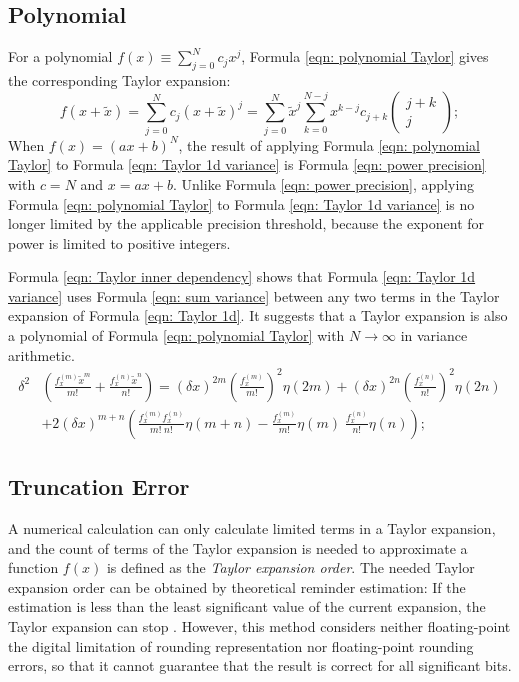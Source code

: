 \documentclass[twoside]{article}
\numberwithin{equation}{section}
\begin{document}
\fi

\subsection{Polynomial}

For a polynomial $f(x) \equiv \sum_{j=0}^{N} c_j x^j$, Formula \eqref{eqn: polynomial Taylor} gives the corresponding Taylor expansion:
\begin{equation}
\label{eqn: polynomial Taylor}
f(x + \tilde{x}) = \sum_{j=0}^{N} c_j (x + \tilde{x})^j = \sum_{j=0}^{N} \tilde{x}^{j} \sum_{k=0}^{N-j} x^{k - j} c_{j + k} \begin{pmatrix} j + k \\ j \end{pmatrix};
\end{equation}
When $f(x) = (ax + b)^N$, the result of applying Formula \eqref{eqn: polynomial Taylor} to Formula \eqref{eqn: Taylor 1d variance} is Formula \eqref{eqn: power precision} with $c=N$ and $x = ax + b$. 
Unlike Formula \eqref{eqn: power precision}, applying Formula \eqref{eqn: polynomial Taylor} to Formula \eqref{eqn: Taylor 1d variance} is no longer limited by the applicable precision threshold, because the exponent for power is limited to positive integers.

Formula \eqref{eqn: Taylor inner dependency} shows that Formula \eqref{eqn: Taylor 1d variance} uses Formula \eqref{eqn: sum variance} between any two terms in the Taylor expansion of Formula \eqref{eqn: Taylor 1d}.
It suggests that a Taylor expansion is also a polynomial of Formula \eqref{eqn: polynomial Taylor} with $N \rightarrow \infty$ in variance arithmetic.
\begin{align}
\label{eqn: Taylor inner dependency}
\delta^2 & \left( \frac{f^{(m)}_x \tilde{x}^m}{m!} + \frac{f^{(n)}_x \tilde{x}^n}{n!} \right) = 
    (\delta x)^{2m} (\frac{f^{(m)}_x }{m!})^2 \eta(2m) + (\delta x)^{2n} (\frac{f^{(n)}_x }{n!})^2 \eta(2n) \\
  &+ 2 (\delta x)^{m+n} \left( \frac{f^{(m)}_x f^{(n)}_x}{m! \;n!} \eta(m+n) 	- \frac{f^{(m)}_x}{m!} \eta(m) \;\frac{f^{(n)}_x}{n!}  \eta(n) \right);  \nonumber
\end{align}


\subsection{Truncation Error}

A numerical calculation can only calculate limited terms in a Taylor expansion, and the count of terms of the Taylor expansion is needed to approximate a function $f(x)$ is defined as the \emph{Taylor expansion order}.
The needed Taylor expansion order can be obtained by theoretical reminder estimation: If the estimation is less than the least significant value of the current expansion, the Taylor expansion can stop \cite{Numerical_Recipes}.
However, this method considers neither floating-point the digital limitation of rounding representation nor floating-point rounding errors, so that it cannot guarantee that the result is correct for all significant bits.
\end{document}
